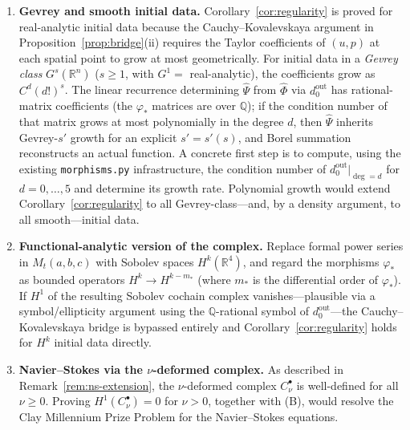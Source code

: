 \documentclass[reqno,10pt]{amsart}
\theoremstyle{definition}
\begin{document}
\begin{enumerate}
\item[\textup{(A)}] \textbf{Gevrey and smooth initial data.}
Corollary~\ref{cor:regularity} is proved for real-analytic initial data
because the Cauchy--Kovalevskaya argument in Proposition~\ref{prop:bridge}(ii)
requires the Taylor coefficients of $(u,p)$ at each spatial point to grow
at most geometrically.  For initial data in a \emph{Gevrey class}
$G^s(\mathbb{R}^n)$ ($s \geq 1$, with $G^1 = $ real-analytic), the
coefficients grow as $C^d(d!)^s$.  The linear recurrence determining
$\widehat{\Psi}$ from $\widehat{\Phi}$ via $d_0^{\mathrm{out}}$ has
rational-matrix coefficients (the $\varphi_*$ matrices are over
$\mathbb{Q}$); if the condition number of that matrix grows at most
polynomially in the degree $d$, then $\widehat{\Psi}$ inherits Gevrey-$s'$
growth for an explicit $s' = s'(s)$, and Borel summation reconstructs an
actual function.  A concrete first step is to compute, using the existing
\texttt{morphisms.py} infrastructure, the condition number of
$d_0^{\mathrm{out}}\big|_{\deg = d}$ for $d = 0,\ldots,5$ and determine
its growth rate.  Polynomial growth would extend
Corollary~\ref{cor:regularity} to all Gevrey-class---and, by a density
argument, to all smooth---initial data.

\item[\textup{(B)}] \textbf{Functional-analytic version of the complex.}
Replace formal power series in $M_t(a,b,c)$ with Sobolev spaces
$H^k(\mathbb{R}^4)$, and regard the morphisms $\varphi_*$ as bounded
operators $H^k \to H^{k - m_*}$ (where $m_*$ is the differential order
of $\varphi_*$).  If $H^1$ of the resulting Sobolev cochain complex
vanishes---plausible via a symbol/ellipticity argument using the
$\mathbb{Q}$-rational symbol of $d_0^{\mathrm{out}}$---the
Cauchy--Kovalevskaya bridge is bypassed entirely and
Corollary~\ref{cor:regularity} holds for $H^k$ initial data directly.

\item[\textup{(C)}] \textbf{Navier--Stokes via the $\nu$-deformed complex.}
As described in Remark~\ref{rem:ns-extension}, the $\nu$-deformed complex
$C^\bullet_\nu$ is well-defined for all $\nu \geq 0$.  Proving
$H^1(C^\bullet_\nu) = 0$ for $\nu > 0$, together with (B), would resolve
the Clay Millennium Prize Problem for the Navier--Stokes equations.
\end{enumerate}
\end{document}
